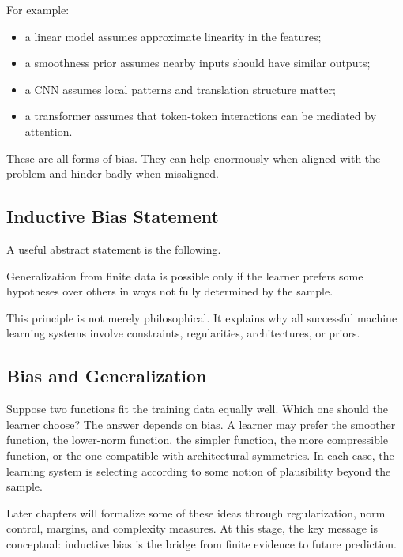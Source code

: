 For example:
\begin{itemize}
    \item a linear model assumes approximate linearity in the features;
    \item a smoothness prior assumes nearby inputs should have similar outputs;
    \item a CNN assumes local patterns and translation structure matter;
    \item a transformer assumes that token-token interactions can be mediated by attention.
\end{itemize}

These are all forms of bias. They can help enormously when aligned with the problem and hinder badly when misaligned.

\subsection{Inductive Bias Statement}

A useful abstract statement is the following.

\begin{statement}
Generalization from finite data is possible only if the learner prefers some hypotheses over others in ways not fully determined by the sample.
\end{statement}

This principle is not merely philosophical. It explains why all successful machine learning systems involve constraints, regularities, architectures, or priors.

\subsection{Bias and Generalization}

Suppose two functions fit the training data equally well. Which one should the learner choose? The answer depends on bias. A learner may prefer the smoother function, the lower-norm function, the simpler function, the more compressible function, or the one compatible with architectural symmetries. In each case, the learning system is selecting according to some notion of plausibility beyond the sample.

Later chapters will formalize some of these ideas through regularization, norm control, margins, and complexity measures. At this stage, the key message is conceptual: inductive bias is the bridge from finite evidence to future prediction.


